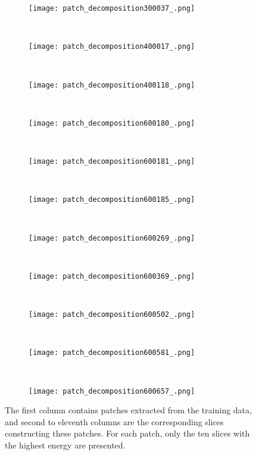 \documentclass[10pt,twocolumn,letterpaper]{article}
\begin{document}
\begin{figure}[b!]
	\centering
	\begin{subfigure}{0.4\textwidth}
		\centering
		\texttt{[image: patch\_decomposition300037\_.png]}
	\end{subfigure}
	\\[0.1cm]
	\begin{subfigure}{0.4\textwidth}
		\centering
		\texttt{[image: patch\_decomposition400017\_.png]}
	\end{subfigure}
	\\[0.1cm]
	\begin{subfigure}{0.4\textwidth}
		\centering
		\texttt{[image: patch\_decomposition400118\_.png]}
	\end{subfigure}
	\\[0.1cm]
	\begin{subfigure}{0.4\textwidth}
		\centering
		\texttt{[image: patch\_decomposition600180\_.png]}
	\end{subfigure}
	\\[0.1cm]
	\begin{subfigure}{0.4\textwidth}
		\centering
		\texttt{[image: patch\_decomposition600181\_.png]}
	\end{subfigure}
	\\[0.1cm]
	\begin{subfigure}{0.4\textwidth}
		\centering
		\texttt{[image: patch\_decomposition600185\_.png]}
	\end{subfigure}
	\\[0.1cm]
	\begin{subfigure}{0.4\textwidth}
		\centering
		\texttt{[image: patch\_decomposition600269\_.png]}
	\end{subfigure}
	\\[0.1cm]
	\begin{subfigure}{0.4\textwidth}
		\centering
		\texttt{[image: patch\_decomposition600369\_.png]}
	\end{subfigure}
	\\[0.1cm]
	\begin{subfigure}{0.4\textwidth}
		\centering
		\texttt{[image: patch\_decomposition600502\_.png]}
	\end{subfigure}
	\\[0.1cm]
	\begin{subfigure}{0.4\textwidth}
		\centering
		\texttt{[image: patch\_decomposition600581\_.png]}
	\end{subfigure}
	\\[0.1cm]
	\begin{subfigure}{0.4\textwidth}
		\centering
		\texttt{[image: patch\_decomposition600657\_.png]}
	\end{subfigure}
	\caption{The first column contains patches extracted from the training data, and second to eleventh columns are the corresponding slices constructing these patches. For each patch, only the ten slices with the highest energy are presented.}
	\label{Fig:patch_decomposition}
\end{figure}
\end{document}
